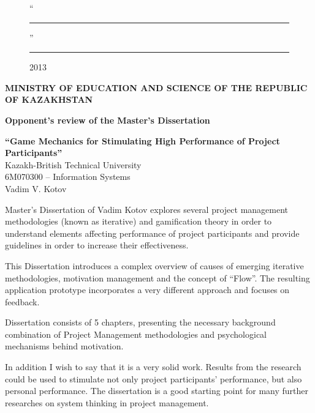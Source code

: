 \begin{titlepage}
\begin{figure}[ht]
\begin{minipage}[t]{0.6\linewidth}
                ``\rule{2em}{0.4pt}'' \rule{8em}{0.4pt} 2013\\
         \end{minipage}
    \end{figure}
        
        \pagebreak

    \begin{centering}
        {\bf{\MakeUppercase{Ministry of education and science of the republic of Kazakhstan}}}

       \vspace{14pt}

        {\bf
        Opponent's review of the Master's Dissertation\\
        }

        \vspace{14pt}
        
        {\bf``Game Mechanics for Stimulating High Performance of Project Participants''}\\
        {\small Kazakh-British Technical University\\
        6M070300 -- Information Systems\\
        Vadim V. Kotov\\}
        
        \vspace{14pt}
        
    \end{centering}
    
    Master's Dissertation of Vadim Kotov explores several project management methodologies (known as iterative) and gamification theory in order to understand elements affecting performance of project participants and provide guidelines in order to increase their effectiveness.
    
    This Dissertation introduces a complex overview of causes of emerging iterative methodologies, motivation management and the concept of ``Flow''. The resulting application prototype incorporates a very different approach and focuses on feedback.
    
    Dissertation consists of 5 chapters, presenting the necessary background combination of Project Management methodologies and psychological mechanisms behind motivation.
    
    In addition I wish to say that it is a very solid work. Results from the research could be used to stimulate not only project participants' performance, but also personal performance. The dissertation is a good starting point for many further researches on system thinking in project management.
    

\end{titlepage}
